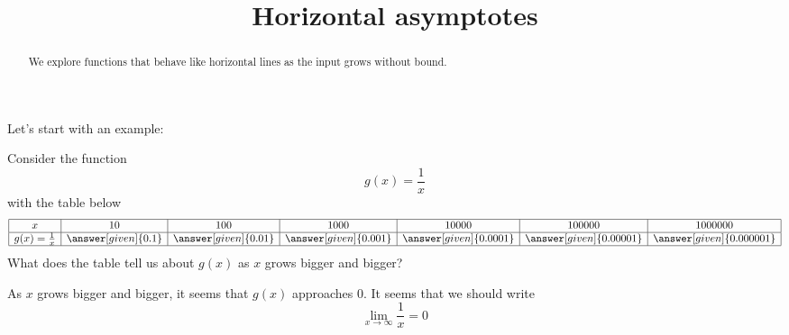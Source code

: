 \documentclass{ximera}
\title[Dig-In:]{Horizontal asymptotes}
\begin{document}
\begin{abstract}
We explore functions that behave like horizontal lines as the input
grows without bound.
\end{abstract}
\maketitle


Let's start with an example:
\begin{example}
Consider the function
\[
g(x) = \frac{1}{x}
\]
with the table below
  \[
\begin{array}{|c|c|c|c|c|c|c|}
\hline
x & 10 & 100 & 1000 &10000 & 100000 & 1000000  \\\hline

g(x)=\frac{1}{x} & \answer[given]{0.1} & \answer[given]{0.01} & \answer[given]{0.001} & \answer[given]{0.0001} & \answer[given]{0.00001} & \answer[given]{0.000001} \\
\hline
\end{array}
\]
What does the table tell us about $g(x)$ as $x$ grows bigger and bigger?
\begin{explanation}
As $x$ grows bigger and bigger, it seems that $g(x)$ approaches $0$. It seems that we should write
\[
 \lim_{x\to \infty}\frac{1}{x}=0 
 \]
\end{explanation}
\end{example}
\end{document}
